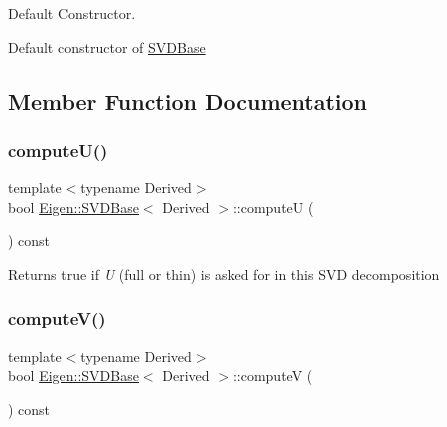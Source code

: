 Default Constructor. 

Default constructor of \mbox{\hyperlink{class_eigen_1_1_s_v_d_base}{S\+V\+D\+Base}} 

\subsection{Member Function Documentation}
\mbox{\label{class_eigen_1_1_s_v_d_base_a705a7c2709e1624ccc19aa748a78d473}} 
\subsubsection{\texorpdfstring{computeU()}{computeU()}}
{\footnotesize\ttfamily template$<$typename Derived$>$ \\
bool \mbox{\hyperlink{class_eigen_1_1_s_v_d_base}{Eigen\+::\+S\+V\+D\+Base}}$<$ Derived $>$\+::computeU (\begin{DoxyParamCaption}{ }\end{DoxyParamCaption}) const\hspace{0.3cm}{\ttfamily [inline]}}

\begin{DoxyReturn}{Returns}
true if {\itshape U} (full or thin) is asked for in this S\+VD decomposition 
\end{DoxyReturn}
\mbox{\label{class_eigen_1_1_s_v_d_base_a5f12efcb791eb007d4a4890ac5255ac4}} 
\subsubsection{\texorpdfstring{computeV()}{computeV()}}
{\footnotesize\ttfamily template$<$typename Derived$>$ \\
bool \mbox{\hyperlink{class_eigen_1_1_s_v_d_base}{Eigen\+::\+S\+V\+D\+Base}}$<$ Derived $>$\+::computeV (\begin{DoxyParamCaption}{ }\end{DoxyParamCaption}) const\hspace{0.3cm}{\ttfamily [inline]}}

